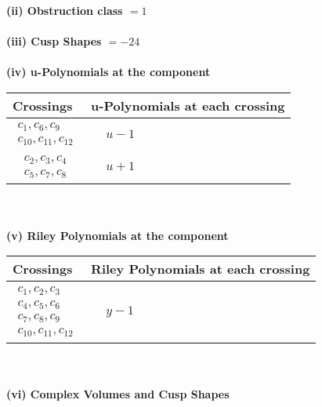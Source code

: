 \documentclass[1p]{elsarticle_modified}
\theoremstyle{definition}
\begin{document}
\flushleft \textbf{(ii) Obstruction class $= 1$}\\~\\
\flushleft \textbf{(iii) Cusp Shapes $= -24$}\\~\\
\newpage\renewcommand{\arraystretch}{1}
\flushleft \textbf{(iv) u-Polynomials at the component}\newline \\
\begin{tabular}{m{50pt}|m{274pt}}
Crossings & \hspace{64pt}u-Polynomials at each crossing \\
\hline $$\begin{aligned}c_{1},c_{6},c_{9}\\c_{10},c_{11},c_{12}\end{aligned}$$&$\begin{aligned}
&u-1
\end{aligned}$\\
\hline $$\begin{aligned}c_{2},c_{3},c_{4}\\c_{5},c_{7},c_{8}\end{aligned}$$&$\begin{aligned}
&u+1
\end{aligned}$\\
\hline
\end{tabular}\\~\\
\newpage\renewcommand{\arraystretch}{1}
\flushleft \textbf{(v) Riley Polynomials at the component}\newline \\
\begin{tabular}{m{50pt}|m{274pt}}
Crossings & \hspace{64pt}Riley Polynomials at each crossing \\
\hline $$\begin{aligned}c_{1},c_{2},c_{3}\\c_{4},c_{5},c_{6}\\c_{7},c_{8},c_{9}\\c_{10},c_{11},c_{12}\end{aligned}$$&$\begin{aligned}
&y-1
\end{aligned}$\\
\hline
\end{tabular}\\~\\
\newpage\flushleft \textbf{(vi) Complex Volumes and Cusp Shapes}
\end{document}
